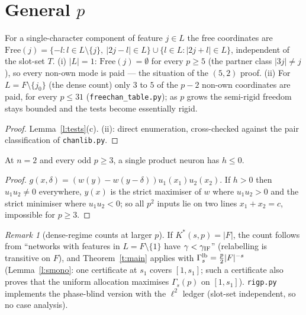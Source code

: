 \documentclass[11pt]{article}
\theoremstyle{remark}\newtheorem{remark}[theorem]{Remark}
\begin{document}
\section*{General $p$}
\begin{proposition}\label{p:free}
For a single-character component of feature $j\in L$ the free coordinates are
$\mathrm{Free}(j)=\{-l: l\in L\setminus\{j\},\ |2j-l|\in L\}\cup\{l\in L: |2j+l|\in L\}$, independent of the slot-set $T$.
(i) $|L|=1$: $\mathrm{Free}(j)=\emptyset$ for every $p\ge5$ (the partner class $|3j|\ne j$), so every non-own mode is paid --- the
situation of the $(5,2)$ proof.  (ii) For $L=F\setminus\{j_0\}$ (the dense count) only $3$ to $5$ of the $p-2$ non-own coordinates are
paid, for every $p\le31$ (\texttt{freechan\_table.py}); as $p$ grows the semi-rigid freedom stays bounded and the tests become
essentially rigid.
\end{proposition}
\begin{proof}
Lemma~\ref{l:tests}(c).  (ii): direct enumeration, cross-checked against the pair classification of \texttt{chanlib.py}.
\end{proof}

\begin{lemma}\label{l:oneneuron}
At $n=2$ and every odd $p\ge3$, a single product neuron has $h\le0$.
\end{lemma}
\begin{proof}
$g(x,\delta)=(w(y)-w(y-\delta))u_1(x_1)u_2(x_2)$.  If $h>0$ then $u_1u_2\ne0$ everywhere, $y(x)$ is the strict maximiser of $w$ where
$u_1u_2>0$ and the strict minimiser where $u_1u_2<0$; so all $p^2$ inputs lie on two lines $x_1+x_2=c$, impossible for $p\ge3$.
\end{proof}

\begin{remark}[dense-regime counts at larger $p$]
If $K^*(s,p)=|F|$, the count follows from ``networks with features in $L=F\setminus\{1\}$ have $\gamma<\gamma_{\rm IF}$'' (relabelling
is transitive on $F$), and Theorem~\ref{t:main} applies with $\Gamma^{\rm lb}_s=\frac p2|F|^{-s}$ (Lemma~\ref{l:smono}: one certificate at
$s_1$ covers $[1,s_1]$; such a certificate also proves that the uniform allocation maximises $\Gamma_s(p)$ on $[1,s_1]$).  \texttt{rigp.py}
implements the phase-blind version with the $\ell^2$ ledger (slot-set independent, so no case analysis).
\end{remark}
\end{document}
